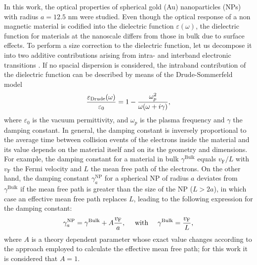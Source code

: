 
In this work, the optical properties of spherical gold (Au) nanoparticles (NPs) with radius $a = 12.5$ nm were studied. Even though the optical response of a non magnetic material is codified into the dielectric function $\varepsilon(\omega)$, the dielectric function for materials at the nanoscale differs from those in bulk due to surface effects. To perform a size correction to the dielectric function, let us decompose it into two additive contributions arising from intra- and interband electronic transitions \cite{noguez_surface_2007}. If no spacial dispersion is considered, the intraband contribution of the dielectric function can be described by means of the Drude-Sommerfeld model 
%
\begin{align}
\frac{\varepsilon_\text{\scriptsize Drude}(\omega)}{\varepsilon_0} = 1 - \frac{\omega_p^2}{\omega(\omega + i \gamma)},
\label{eq:Drude}
\end{align}
% 
where $\varepsilon_0$ is the vacuum permittivity, and $\omega_p$ is the plasma frequency and $\gamma$ the damping constant. In general, the damping constant is inversely proportional to the average time between collision events of the electrons inside the material and its value depends on the material itself and on its the geometry and dimensions. For example, the damping constant for a material in bulk $\gamma^\text{Bulk}$ equals $v_\text{F}/L$  with $v_\text{F}$ the Fermi velocity and $L$ the  mean free path of the electrons. On the other hand, the damping constant $\gamma^\text{NP}_a$ for a spherical NP of radius $a$ deviates from $\gamma^\text{Bulk}$ if the mean free path is greater than the size of the NP ($ L > 2a $), in which case an effective  mean free path replaces $L$, leading to the following expression for the damping constant:
%
\begin{align}
\gamma^\text{\scriptsize  NP}_a =  \gamma^\text{\scriptsize Bulk} + A\frac{v_\text{F}}{a},
\qqtext{ with }
\gamma^\text{\scriptsize  Bulk} = \frac{v_\text{F}}{L},
\label{eq:SC}
\end{align}
%
where $A$ is a theory dependent parameter whose exact value changes according to the approach employed to calculate the effective mean free path; for this work it is considered that $A = 1$. 

